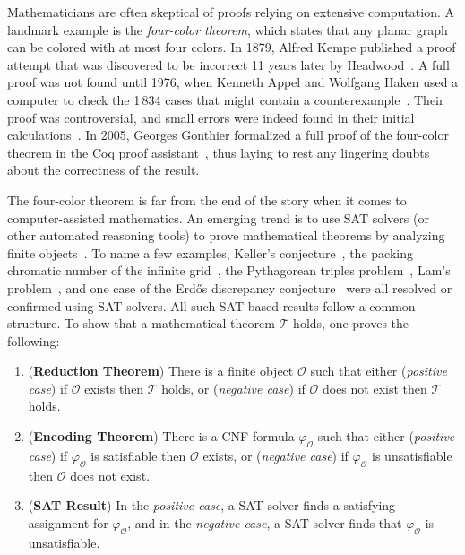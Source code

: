 Mathematicians are often skeptical of proofs relying on extensive computation.
A landmark example is the \emph{four-color theorem}, which states that any planar graph can be colored with at most four colors.
In 1879, Alfred Kempe published a proof attempt that was discovered to be incorrect 11 years later by Headwood~\cite{Walters2004ItAT,Wilson2002GraphsCA}.
A full proof was not found until 1976, when Kenneth Appel and Wolfgang Haken used a computer to check the 1\,834 cases that might contain a counterexample~\cite{appelFourColorProblem1978}.
Their proof was controversial, and small errors were indeed found in their initial calculations~\cite{Walters2004ItAT,Wilson2002GraphsCA}.
In 2005, Georges Gonthier formalized a full proof of the four-color theorem in the \textsf{Coq} proof assistant~\cite{gonthierFourColourTheorem2008a}, thus laying to rest any lingering doubts about the correctness of the result.

The four-color theorem is far from the end of the story when it comes to computer-assisted mathematics.
An emerging trend is to use SAT solvers (or other automated reasoning tools) to prove mathematical theorems by analyzing finite objects~\cite{avigad2023mathematics}.
To name a few examples,
Keller's conjecture~\cite{brakensiek2023resolution},
the packing chromatic number of the infinite grid~\cite{Subercaseaux_Heule_2023},
the Pythagorean triples problem~\cite{Heule_2016},
Lam's problem~\cite{21bright_sat_based_resolution_lams_problem},
and one case of the Erd\H{o}s discrepancy conjecture~\cite{konev2014sat}
were all resolved or confirmed using SAT solvers.
All such SAT-based results follow a common structure. To show that a mathematical theorem $\mathcal{T}$ holds, one proves the following:

\begin{enumerate}
  \item (\textbf{Reduction Theorem}) There is a finite object $\mathcal{O}$ such that either (\emph{positive case}) if $\mathcal{O}$ exists then $\mathcal{T}$ holds, or (\emph{negative case}) if $\mathcal{O}$ does not exist then $\mathcal{T}$ holds. %
  \item (\textbf{Encoding Theorem}) There is a CNF formula $\varphi_{\mathcal{O}}$ such that either (\emph{positive case}) if $\varphi_{\mathcal{O}}$ is satisfiable then $\mathcal{O}$ exists, or (\emph{negative case}) if $\varphi_{\mathcal{O}}$ is unsatisfiable then $\mathcal{O}$ does not exist.
  \item (\textbf{SAT Result}) In the \emph{positive case}, a SAT solver finds a satisfying assignment for $\varphi_{\mathcal{O}}$, and in the \emph{negative case}, a SAT solver finds that $\varphi_{\mathcal{O}}$ is unsatisfiable.
\end{enumerate}

